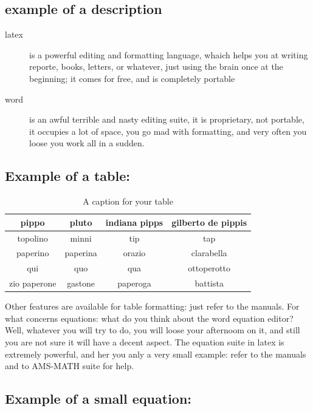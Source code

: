 \subsection{example of a description}
\begin{description}
\item[latex] is a powerful editing and formatting language, whaich helps you
at writing reporte, books, letters, or whatever, just using the brain 
once at the beginning; it comes for free, and is completely portable
\item[word] is an awful terrible and nasty editing suite, it is proprietary,
not portable, it occupies a lot of space, you go mad with formatting,
and very often you loose you work all in a sudden. 
\end{description}


\subsection{Example of a table:}

\begin{table}
\begin{center}
\begin{tabular}{|c|c|c|c|}
\hline
pippo & pluto & indiana pipps & gilberto de pippis \\
\hline
topolino & minni & tip & tap \\
\hline
\hline
paperino & paperina & orazio & clarabella \\
\hline
qui & quo & qua & ottoperotto \\
zio paperone & gastone & paperoga & battista \\ 
\hline 
\end{tabular}
\end{center}
\caption{A caption for your table}
\label{A-lable-for-your-table}
\end{table}


Other features are available for table formatting: just refer to the manuals.
For what concerns equations: what do you think about the word equation editor?
Well, whatever you will try to do, you will loose your afternoom on it, and
still you are not sure it will have a decent aspect. The equation suite
in latex is extremely powerful, and her you anly a very small example:
refer to the manuals and to AMS-MATH suite for help.


\subsection{Example of a small equation:}

